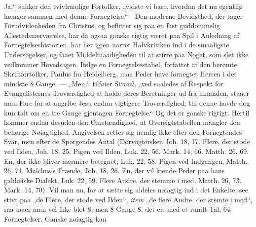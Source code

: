 \documentclass[12pt,a4paper]{book}
\begin{document}
Ja,“ sukker den tvivlraadige Fortolker, „vidste vi bare, hvordan det nu egentlig hænger
sammen med denne Fornegtelse.“---Den moderne Bevidsthed, der tager Forudvidenheden fra
Christus, og beflitter sig paa en fast guddommelig Allestedsnærværelse, har da ogsaa
ganske rigtig været paa Spil i Anledning af Fornegtelseshistorien, har her igjen narret
Halvkritiken ind i de smaaligste Undersøgelser, og faaet Middelmaadigheden til at stirre
paa Noget, som slet ikke vedkommer Hovedsagen. Ifølge en Fornegtelsestabel, forfattet af
den berømte Skriftfortolker, Paulus fra Heidelberg, maa Peder have fornegtet Herren i det
mindste 8 Gange. --- „Men,“ tilføier Strauß, „ved saaledes af Respekt for Evangelisternes
Troværdighed at holde deres Beretninger ud fra hinanden, staaer man Fare for at angribe
Jesu endnu vigtigere Troværdighed; thi denne havde dog kun talt om en tre Gange gjentagen
Fornegtelse.“ Og det er ganske rigtigt. Hertil kommer endnu desuden den Omstændighed, at
Oversigtstabellen mangler den behørige Nøiagtighed. Angivelsen retter sig nemlig ikke
efter den Fornegtendes Svar, men efter de Spørgendes Antal (Dørvogtersken Joh. 18, 17.
Flere, der stode ved Ilden, Joh. 18, 25. Pigen ved Ilden, Luk. 22, 56. Mark. 14, 66.
Matth. 26, 69. En, der ikke bliver nærmere betegnet, Luk. 22, 58. Pigen ved Indgangen,
Matth. 26, 71. Malchus's Frænde, Joh. 18, 26. En, der vil kjende Peder paa hans
galilæiske Dialekt, Luk. 22, 59. Flere Andre, der stemme i med, Matth. 26, 73. Mark. 14,
70). Vil man nu, for at sætte sig aldeles nøiagtig ind i det Enkelte, see stivt paa „de
Flere, der stode ved Ilden“, \textit{item} „de flere Andre, der stemte i med“, saa faaer
man vel ikke blot 8, men 8 Gange 8, det er, med et rundt Tal, 64 Fornegtelser. Ganske
nøiagtig kan
\end{document}
